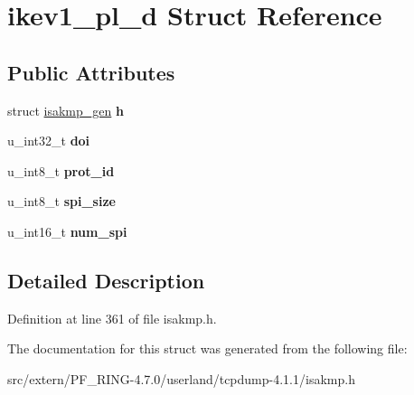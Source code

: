 \hypertarget{structikev1__pl__d}{
\section{ikev1\_\-pl\_\-d Struct Reference}
\label{structikev1__pl__d}
}
\subsection*{Public Attributes}
\begin{DoxyCompactItemize}
\item 
\hypertarget{structikev1__pl__d_ad48238c439e4eeae7fe5819c6e4eb1c7}{
struct \hyperlink{structisakmp__gen}{isakmp\_\-gen} {\bfseries h}}
\label{structikev1__pl__d_ad48238c439e4eeae7fe5819c6e4eb1c7}

\item 
\hypertarget{structikev1__pl__d_aba7290e18a9dea65297a133c50a7f9ac}{
u\_\-int32\_\-t {\bfseries doi}}
\label{structikev1__pl__d_aba7290e18a9dea65297a133c50a7f9ac}

\item 
\hypertarget{structikev1__pl__d_a683712f01563be5f628f85a5cfa1a9eb}{
u\_\-int8\_\-t {\bfseries prot\_\-id}}
\label{structikev1__pl__d_a683712f01563be5f628f85a5cfa1a9eb}

\item 
\hypertarget{structikev1__pl__d_a9820907d0c4b21a2b70b5950ba3c94ee}{
u\_\-int8\_\-t {\bfseries spi\_\-size}}
\label{structikev1__pl__d_a9820907d0c4b21a2b70b5950ba3c94ee}

\item 
\hypertarget{structikev1__pl__d_ad75b111aa0cfcaf2bc16f3d831237402}{
u\_\-int16\_\-t {\bfseries num\_\-spi}}
\label{structikev1__pl__d_ad75b111aa0cfcaf2bc16f3d831237402}

\end{DoxyCompactItemize}


\subsection{Detailed Description}


Definition at line 361 of file isakmp.h.



The documentation for this struct was generated from the following file:\begin{DoxyCompactItemize}
\item 
src/extern/PF\_\-RING-\/4.7.0/userland/tcpdump-\/4.1.1/isakmp.h\end{DoxyCompactItemize}
